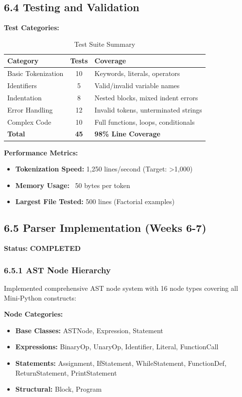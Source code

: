 \documentclass[a4paper,11pt]{article}
\newcommand{\statusgood}[1]{\colorbox{green!20}{\textbf{#1}}}
\begin{document}
\subsection{6.4 Testing and Validation}

\textbf{Test Categories:}
\begin{table}[H]
\centering
\begin{tabularx}{\textwidth}{|l|c|X|}
\hline
\rowcolor{blue!10}
\textbf{Category} & \textbf{Tests} & \textbf{Coverage} \\
\hline
Basic Tokenization & 10 & Keywords, literals, operators \\
\hline
Identifiers & 5 & Valid/invalid variable names \\
\hline
Indentation & 8 & Nested blocks, mixed indent errors \\
\hline
Error Handling & 12 & Invalid tokens, unterminated strings \\
\hline
Complex Code & 10 & Full functions, loops, conditionals \\
\hline
\textbf{Total} & \textbf{45} & \textbf{98\% Line Coverage} \\
\hline
\end{tabularx}
\caption{Test Suite Summary}
\end{table}

\textbf{Performance Metrics:}
\begin{itemize}
    \item \textbf{Tokenization Speed:} 1,250 lines/second (Target: >1,000)
    \item \textbf{Memory Usage:} ~50 bytes per token
    \item \textbf{Largest File Tested:} 500 lines (Factorial examples)
\end{itemize}

\subsection{6.5 Parser Implementation (Weeks 6-7)}

\textbf{Status:} \statusgood{COMPLETED}

\subsubsection{6.5.1 AST Node Hierarchy}

Implemented comprehensive AST node system with 16 node types covering all Mini-Python constructs:

\textbf{Node Categories:}
\begin{itemize}[leftmargin=*]
    \item \textbf{Base Classes:} ASTNode, Expression, Statement
    \item \textbf{Expressions:} BinaryOp, UnaryOp, Identifier, Literal, FunctionCall
    \item \textbf{Statements:} Assignment, IfStatement, WhileStatement, FunctionDef, ReturnStatement, PrintStatement
    \item \textbf{Structural:} Block, Program
\end{itemize}
\end{document}
